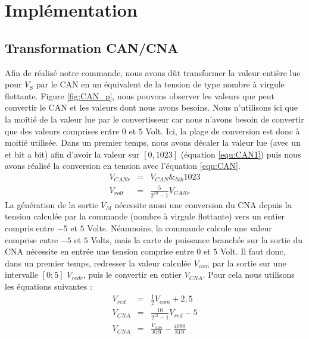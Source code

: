 \chapter{Implémentation}
\section{Transformation CAN/CNA}
Afin de réalisé notre commande, nous avons dût transformer la valeur entière lue pour $V_S$ par le CAN en un équivalent de la tension de type nombre à virgule flottante.  Figure \ref{fig:CAN_p}, nous pouvons observer les valeurs que peut convertir le CAN et les valeurs dont nous avons besoins. Nous n'utilisons ici que la moitié de la valeur lue par le convertisseur car nous n'avons besoin de convertir que des valeurs comprises entre $0$ et $5$ Volt. Ici, la plage de conversion est donc à moitié utilisée. 
Dans un premier temps, nous avons décaler la valeur lue (avec un et bit a bit) afin d'avoir la valeur sur $\left[ 0 , 1023\right]$ (équation \ref{equ:CAN1}) puis  nous avons réalisé la conversion en tension avec l'équation \ref{equ:CAN}.
\begin{eqnarray}
\label{equ:CAN1}V_{CANr} &=& V_{CAN} \&_{bàb} 1023\\
\label{equ:CAN}V_{volt} &=& \frac{5}{2^{10}-1}V_{CANr}
\end{eqnarray}
La génération de la sortie $V_M$ nécessite aussi une conversion du CNA depuis la tension calculée par la commande (nombre à virgule flottante) vers un entier compris entre $-5$ et $5$ Volts. Néanmoins, la commande calcule une valeur comprise entre $-5$ et $5$ Volts, mais la carte de puissance branchée sur la sortie du CNA nécessite en entrée une tension comprise entre $0$ et $5$ Volt. Il faut donc, dans un premier temps, redresser la valeur calculée $V_{com}$ par la sortie sur une intervalle $\left[0;5\right]$ $V_{redr}$, puis le convertir en entier $V_{CNA}$. Pour cela nous utilisons les équations suivantes :
\begin{equation}
\begin{array}{lcl}
V_{red}	&=&	\frac{1}{2}V_{com}+2,5\\
V_{CNA} &=& \frac{10}{2^{12}-1}V_{red}-5\\
V_{CNA} &=& \frac{V_{com}}{819} - \frac{4090}{819}
\end{array}
\end{equation}	
